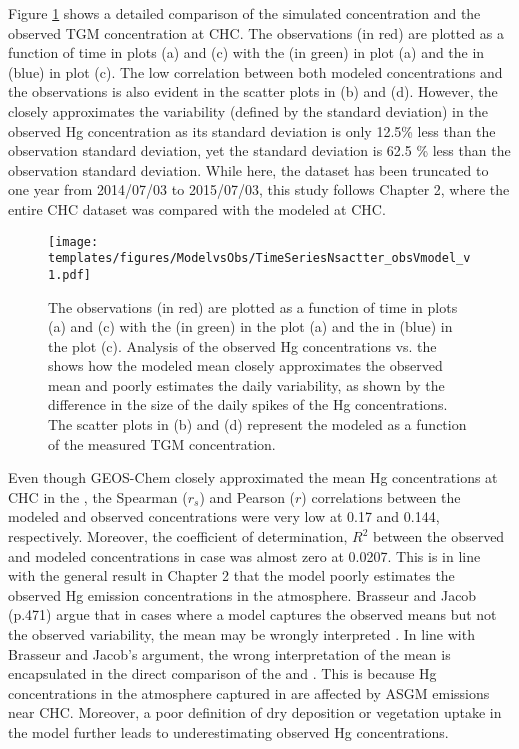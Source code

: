 \FloatBarrier
\begin{flushleft}
   Figure \ref{fig:ModelvsObsNstats} shows a detailed comparison of the simulated \hg concentration and the observed TGM concentration at CHC. The observations (in red) are plotted as a function of time in plots (a) and (c) with the \off (in green) in plot (a)  and the \on in (blue) in plot (c). 
   The low correlation between both modeled \hg concentrations and the observations is also evident in the scatter plots in (b) and (d).  However, the \on closely approximates the variability (defined by the standard deviation)  in the observed Hg concentration as its standard deviation is only 12.5\% less than the  observation standard deviation, yet the \off standard deviation is 62.5 \% less than the observation standard deviation. While here, the dataset has been truncated to one year from 2014/07/03 to 2015/07/03, this study follows Chapter 2, where the entire CHC dataset was compared with the modeled \hgc at CHC. 
\end{flushleft}
\begin{figure}[H]
  \texttt{[image: templates/figures/ModelvsObs/TimeSeriesNsactter\_obsVmodel\_v1.pdf]}
  \centering
  \caption[Hg concentration in the atmosphere as a function of time and scatter plots of modeled concentration as a function of the observations]{The observations (in red) are plotted as a function of time in plots (a) and (c) with the \off (in green) in the plot (a) and the \on in (blue) in the plot (c). Analysis of the observed Hg concentrations vs. the \off  shows how the modeled mean closely approximates the observed mean and poorly estimates the daily variability, as shown by the difference in the size of the daily spikes of the Hg concentrations. The scatter plots in (b) and (d) represent the modeled \hg  as a function of the measured TGM concentration.}
  \label{fig:ModelvsObsNstats}
\end{figure}
\FloatBarrier

\begin{flushleft}
    Even though GEOS-Chem closely approximated the mean Hg concentrations at CHC in the \off, the Spearman ($r_s$) and Pearson ($r$) correlations between the modeled and observed concentrations were very low at 0.17 and 0.144, respectively. Moreover, the coefficient of determination, $R^2$ between the observed and modeled concentrations in \off case was almost zero at 0.0207. This is in line with the general result in Chapter 2 that the model poorly estimates the observed Hg emission concentrations in the atmosphere. Brasseur and Jacob (p.471)\cite{brasseur_modeling_2017} argue that in cases where a model captures the observed means but not the observed variability, the mean may be wrongly interpreted \cite{brasseur_modeling_2017}. In line with Brasseur and Jacob's argument, the wrong interpretation of the \off mean is encapsulated in the direct comparison of the \off and \obsC.  This is because Hg concentrations in the atmosphere captured in \obsC are affected by ASGM emissions near CHC. Moreover, a poor definition of dry deposition or vegetation uptake in the model further leads to underestimating observed Hg concentrations.  
\end{flushleft}

